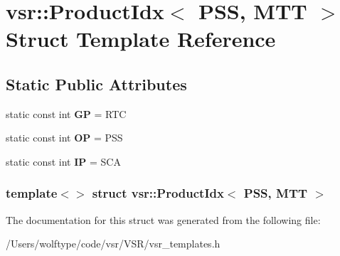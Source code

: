\hypertarget{structvsr_1_1_product_idx_3_01_p_s_s_00_01_m_t_t_01_4}{\section{vsr\-:\-:Product\-Idx$<$ P\-S\-S, M\-T\-T $>$ Struct Template Reference}
\label{structvsr_1_1_product_idx_3_01_p_s_s_00_01_m_t_t_01_4}
}
\subsection*{Static Public Attributes}
\begin{DoxyCompactItemize}
\item 
\hypertarget{structvsr_1_1_product_idx_3_01_p_s_s_00_01_m_t_t_01_4_a41c845132d9e87b7f5a7f9d7b95e8efa}{static const int {\bfseries G\-P} = R\-T\-C}\label{structvsr_1_1_product_idx_3_01_p_s_s_00_01_m_t_t_01_4_a41c845132d9e87b7f5a7f9d7b95e8efa}

\item 
\hypertarget{structvsr_1_1_product_idx_3_01_p_s_s_00_01_m_t_t_01_4_a631195313354366285ca248b933b743d}{static const int {\bfseries O\-P} = P\-S\-S}\label{structvsr_1_1_product_idx_3_01_p_s_s_00_01_m_t_t_01_4_a631195313354366285ca248b933b743d}

\item 
\hypertarget{structvsr_1_1_product_idx_3_01_p_s_s_00_01_m_t_t_01_4_a6ae85fd3dd35f8f8d6311967754bafeb}{static const int {\bfseries I\-P} = S\-C\-A}\label{structvsr_1_1_product_idx_3_01_p_s_s_00_01_m_t_t_01_4_a6ae85fd3dd35f8f8d6311967754bafeb}

\end{DoxyCompactItemize}
\subsubsection*{template$<$$>$ struct vsr\-::\-Product\-Idx$<$ P\-S\-S, M\-T\-T $>$}



The documentation for this struct was generated from the following file\-:\begin{DoxyCompactItemize}
\item 
/\-Users/wolftype/code/vsr/\-V\-S\-R/vsr\-\_\-templates.\-h\end{DoxyCompactItemize}
